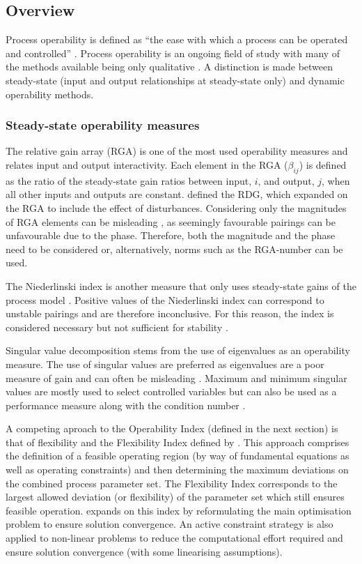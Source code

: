 \subsection{Overview}
Process operability is defined as ``the ease with which a process can be operated and controlled'' \citep[778]{marlin}.
Process operability is an ongoing field of study with many of the methods available being only qualitative \citep[164]{skogestad}. 
A distinction is made between steady-state (input and output relationships at steady-state only) and dynamic operability methods.

\subsubsection{Steady-state operability measures}
The relative gain array (RGA) is one of the most used operability measures \citep[576]{luyben} and relates input and output interactivity.
Each element in the RGA ($\beta_{ij}$) is defined as the ratio of the steady-state gain ratios between input, $i$, and output, $j$, when all other inputs and outputs are constant.
\citet{artrdg} defined the RDG, which expanded on the RGA to include the effect of disturbances. 
Considering only the magnitudes of RGA elements can be misleading \citep[87]{skogestad}, as seemingly favourable pairings can be unfavourable due to the phase.
Therefore, both the magnitude and the phase need to be considered or, alternatively, norms such as the RGA-number can be used.


The Niederlinski index is another measure that only uses steady-state gains of the process model \citep[572-573]{luyben}.
Positive values of the Niederlinski index can correspond to unstable pairings and are therefore inconclusive.
For this reason, the index is considered necessary but not sufficient for stability \citep[445]{skogestad}.

Singular value decomposition stems from the use of eigenvalues as an operability measure. 
The use of singular values are preferred as eigenvalues are a poor
measure of gain and can often be misleading \citep[75]{skogestad}.
Maximum and minimum singular values are mostly used to select controlled variables but can also be used as a performance measure along with the condition number .

A competing aproach to the Operability Index (defined in the next section) is that of flexibility and the Flexibility Index defined by \citep{grossmann1}.
This approach comprises the definition of a feasible operating region (by way of fundamental equations as well as operating constraints) and then determining the maximum deviations on the combined process parameter set.
The Flexibility Index corresponds to the largest allowed deviation (or flexibility) of the parameter set which still ensures feasible operation.
\citep{grossmann2} expands on this index by reformulating the main optimisation problem to ensure solution convergence.
An active constraint strategy is also applied to non-linear problems to reduce the computational effort required and ensure solution convergence (with some linearising assumptions).

